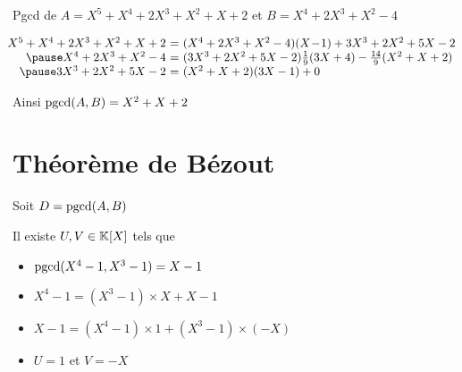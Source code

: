 \begin{frame}
\begin{exemple}
Pgcd de  $A=X^5+X^4+2X^3+X^2+X+2$ et $B=X^4+2X^3+X^2-4$

\medskip
\pause

{\footnotesize
$$\begin{array}{rcl}
\!\!\!\!\!\!X^5+X^4+2X^3+X^2+X+2 & \!\!\!\! = \!\!\!\! & (X^4+2X^3+X^2-4)  (X\!-\!1)  + 3X^3+2X^2+5X-2\\
\pause
X^4+2X^3+X^2-4 & \!\!\!\! = \!\!\!\! & (3X^3+2X^2+5X-2) \frac19(3X+4) - \frac{14}{9}(X^2+X+2) \\
\pause
3X^3+2X^2+5X-2 & \!\!\!\! = \!\!\!\!  & (X^2+X+2) (3X-1) + 0 \\
\end{array}$$
}

\medskip
\pause

Ainsi $\mathop{\text{pgcd}}\nolimits(A,B)=X^2+X+2$
\end{exemple}
\end{frame}

\section{Théorème de Bézout}

\begin{frame}

Soit $D=\mathop{\text{pgcd}}\nolimits(A,B)$

\begin{theoreme}[de Bézout]
\label{thm_Bezout}
Il existe $U, V\in \mathbb{K}[X]$ tels que 
\end{theoreme}

\pause

\begin{exemple}
\begin{itemize}[<+->]
  \item $\mathop{\text{pgcd}}\nolimits(X^4-1, X^3-1) = X-1$
  \item $X^4-1  =  (X^3-1) \times X + X-1$
  \item $X-1 = (X^4-1)\times 1 + (X^3-1) \times (-X)$
  \item $U=1$ et $V=-X$
\end{itemize}
\end{exemple}
\end{frame}


